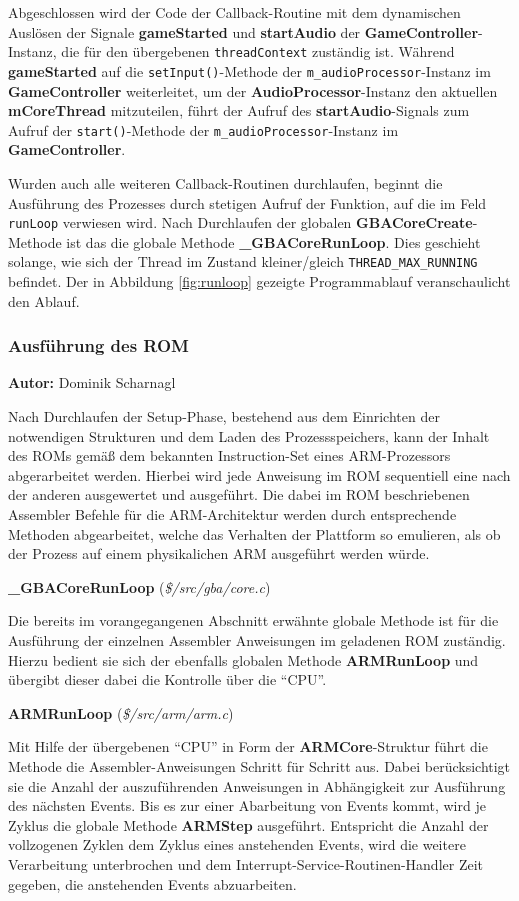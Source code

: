 \documentclass[11pt,a4paper]{scrartcl}
\newcommand{\AutorDominik} {
    \vspace{-4mm}
    \large \textbf{Autor:} Dominik Scharnagl \normalsize
    \vspace{2mm}
}
\newcommand{\paratitlecode}[2] {
    \vspace{5mm}
    \large \textbf{#1} \normalsize(\textit{\${#2}})
    \vspace{2mm}\newline
}
\begin{document}
Abgeschlossen wird der Code der Callback-Routine mit dem dynamischen Ausl\"osen der Signale \textbf{gameStarted} und \textbf{startAudio} der \textbf{GameController}-Instanz, die f\"ur den \"ubergebenen \verb|threadContext| zust\"andig ist. W\"ahrend \textbf{gameStarted} auf die \verb|setInput()|-Methode der \verb|m_audioProcessor|-Instanz im \textbf{GameController} weiterleitet, um der \textbf{AudioProcessor}-Instanz den aktuellen \textbf{mCoreThread} mitzuteilen, f\"uhrt der Aufruf des \textbf{startAudio}-Signals zum Aufruf der \verb|start()|-Methode der \verb|m_audioProcessor|-Instanz im \textbf{GameController}.

Wurden auch alle weiteren Callback-Routinen durchlaufen, beginnt die Ausf\"uhrung des Prozesses durch stetigen Aufruf der Funktion, auf die im Feld \verb|runLoop| verwiesen wird. Nach Durchlaufen der globalen \textbf{GBACoreCreate}-Methode ist das die globale Methode \textbf{{\_}GBACoreRunLoop}. Dies geschieht solange, wie sich der Thread im Zustand kleiner/gleich \verb|THREAD_MAX_RUNNING| befindet. Der in Abbildung \ref{fig:runloop} gezeigte Programmablauf veranschaulicht den Ablauf.


\newpage
\subsubsection{Ausf\"uhrung des ROM}
\AutorDominik

Nach Durchlaufen der Setup-Phase, bestehend aus dem Einrichten der notwendigen Strukturen und dem Laden des Prozessspeichers, kann der Inhalt des ROMs gem\"a{\ss} dem bekannten Instruction-Set eines ARM-Prozessors abgerarbeitet werden. Hierbei wird jede Anweisung im ROM sequentiell eine nach der anderen ausgewertet und ausgef\"uhrt. Die dabei im ROM beschriebenen Assembler Befehle f\"ur die ARM-Architektur werden durch entsprechende Methoden abgearbeitet, welche das Verhalten der Plattform so emulieren, als ob der Prozess auf einem physikalichen ARM ausgef\"uhrt werden w\"urde.

\paratitlecode{{\_}GBACoreRunLoop}{/src/gba/core.c}
Die bereits im vorangegangenen Abschnitt erw\"ahnte globale Methode ist f\"ur die Ausf\"uhrung der einzelnen Assembler Anweisungen im geladenen ROM zust\"andig. Hierzu bedient sie sich der ebenfalls globalen Methode \textbf{ARMRunLoop} und \"ubergibt dieser dabei die Kontrolle \"uber die \enquote{CPU}.

\paratitlecode{ARMRunLoop}{/src/arm/arm.c}
Mit Hilfe der \"ubergebenen \enquote{CPU} in Form der \textbf{ARMCore}-Struktur f\"uhrt die Methode die Assembler-Anweisungen Schritt f\"ur Schritt aus. Dabei ber\"ucksichtigt sie die Anzahl der auszuf\"uhrenden Anweisungen in Abh\"angigkeit zur Ausf\"uhrung des n\"achsten Events. Bis es zur einer Abarbeitung von Events kommt, wird je Zyklus die globale Methode \textbf{ARMStep} ausgef\"uhrt. Entspricht die Anzahl der vollzogenen Zyklen dem Zyklus eines anstehenden Events, wird die weitere Verarbeitung unterbrochen und dem Interrupt-Service-Routinen-Handler Zeit gegeben, die anstehenden Events abzuarbeiten.
\end{document}
